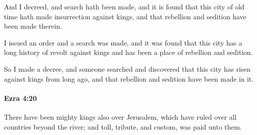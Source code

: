 			\begin{versebox}
					\item[BHS] 
					\item[LXX] 
					\item[ASV] And I decreed, and search hath been made, and it is found that this city of old time hath made insurrection against kings, and that rebellion and sedition have been made therein.
					\item[NIV] I issued an order and a search was made, and it was found that this city has a long history of revolt against kings and has been a place of rebellion and sedition.
					\item[NRSV] So I made a decree, and someone searched and discovered that this city has risen against kings from long ago, and that rebellion and sedition have been made in it.
			\end{versebox}

		\paragraph{Ezra 4:20} %
			\label{EZRA-4-20}

			There have been mighty kings also over Jerusalem, which have ruled over all countries beyond the river; and toll, tribute, and custom, was paid unto them.

